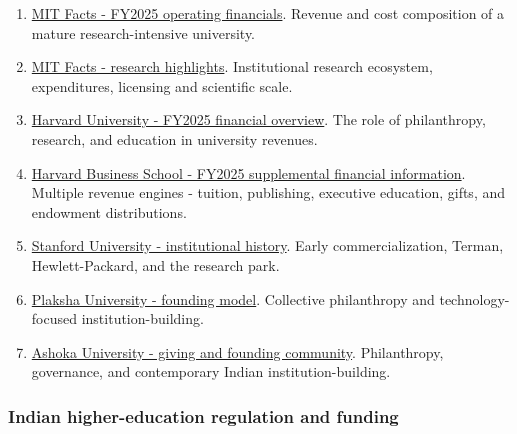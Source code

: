 \begin{enumerate}[leftmargin=*,itemsep=1.5pt]
  \item \href{https://facts.mit.edu/\allowbreak operating-financials/}{MIT Facts - FY2025 operating financials}. Revenue and cost composition of a mature research-intensive university.
  \item \href{https://facts.mit.edu/\allowbreak research-highlights/}{MIT Facts - research highlights}. Institutional research ecosystem, expenditures, licensing and scientific scale.
  \item \href{https://finance.harvard.edu/\allowbreak fy25-financial-overview}{Harvard University - FY2025 financial overview}. The role of philanthropy, research, and education in university revenues.
  \item \href{https://www.hbs.edu/\allowbreak about/annualreport/\allowbreak 2025/financials/\allowbreak supplemental-financial-information}{Harvard Business School - FY2025 supplemental financial information}. Multiple revenue engines - tuition, publishing, executive education, gifts, and endowment distributions.
  \item \href{https://www.stanford.edu/\allowbreak about/history}{Stanford University - institutional history}. Early commercialization, Terman, Hewlett-Packard, and the research park.
  \item \href{https://plaksha.edu.in/\allowbreak about-us}{Plaksha University - founding model}. Collective philanthropy and technology-focused institution-building.
  \item \href{https://giving.ashoka.edu.in/}{Ashoka University - giving and founding community}. Philanthropy, governance, and contemporary Indian institution-building.
\end{enumerate}

\subsubsection*{Indian higher-education regulation and funding}

